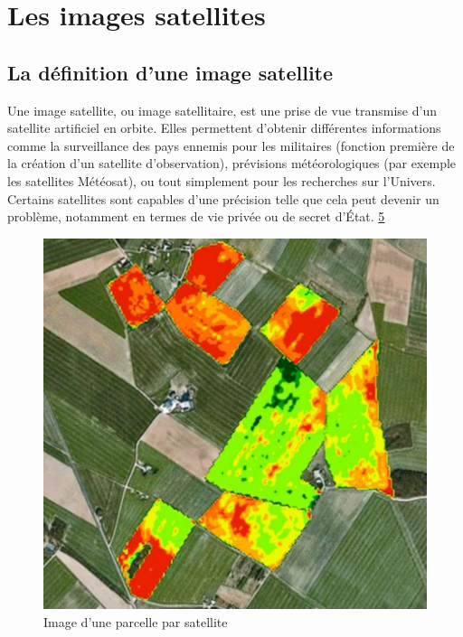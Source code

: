 \documentclass[12pt, openany]{report}
\begin{document}
\section{Les images satellites}
\subsection{La définition d'une image satellite}
Une image satellite, ou image satellitaire, est une prise de vue transmise d'un satellite artificiel en orbite. Elles permettent d'obtenir différentes informations comme la surveillance des pays ennemis pour les militaires (fonction première de la création d'un satellite d'observation), prévisions météorologiques (par exemple les satellites Météosat), ou tout simplement pour les recherches sur l'Univers. Certains satellites sont capables d'une précision telle que cela peut devenir un problème, notamment en termes de vie privée ou de secret d'État. \hyperref[sec:refs]{5}
\begin{figure}[hp]
\centering
\includegraphics[scale=0.5]{img.jpg}
\caption{Image d'une parcelle par satellite}
\end{figure}
\end{document}
